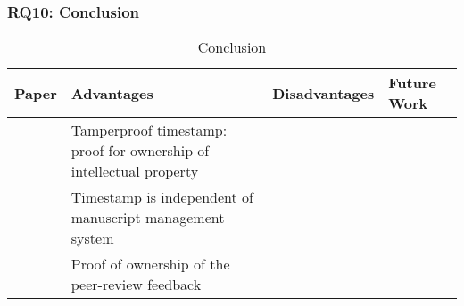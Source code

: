 \clearpage
\subsubsection{RQ10: Conclusion}

\begin{longtable}{ |c|p{4cm}|p{4cm}|p{4cm}| }
	\caption{Conclusion}
	\label{tab:rq10_conclusion}\\
	\hline
 	\textbf{Paper} & \textbf{Advantages} & \textbf{Disadvantages} & \textbf{Future Work}\\ [0.5ex] 
 	\hline\hline
 	\endhead
 	\multirow{3}{*}{\cite{2017_Gipp}} & Tamperproof timestamp: proof for ownership of intellectual property & \multirow{3}{*}{\xmark } & \\
	\cline{2-2}
	 & Timestamp is independent of manuscript management system & & \\
	\cline{2-2}
	 & Proof of ownership of the peer-review feedback & & \\
	\hline
\end{longtable}
